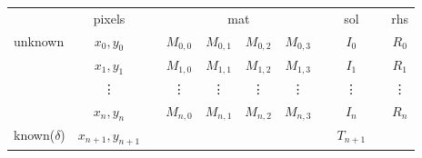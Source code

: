 \documentclass[hidelinks, english]{report}
\begin{document}
    \begin{table*}[t]
        \centering
        \begin{tabular}{lclcccccccc}
            & pixels & & \multicolumn{4}{c}{mat}                                                                                                           & \multicolumn{1}{l}{}  & sol & \multicolumn{1}{l}{}  & rhs                        \\ \cline{2-2} \cline{4-7} \cline{9-9} \cline{11-11}
            \multicolumn{1}{l|}{\multirow{4}{*}{unknown}}         & \multicolumn{1}{c|}{$x_0,y_0$}         & \multicolumn{1}{l|}{} & \multicolumn{1}{c|}{$M_{0,0}$} & \multicolumn{1}{c|}{$M_{0,1}$} & \multicolumn{1}{c|}{$M_{0,2}$} & \multicolumn{1}{c|}{$M_{0,3}$} & \multicolumn{1}{c|}{} & \multicolumn{1}{c|}{$I_0$}     & \multicolumn{1}{c|}{} & \multicolumn{1}{c|}{$R_0$} \\ \cline{2-2} \cline{4-7} \cline{9-9} \cline{11-11}
            \multicolumn{1}{l|}{}                                 & \multicolumn{1}{c|}{$x_1,y_1$}         & \multicolumn{1}{l|}{} & \multicolumn{1}{c|}{$M_{1,0}$} & \multicolumn{1}{c|}{$M_{1,1}$} & \multicolumn{1}{c|}{$M_{1,2}$} & \multicolumn{1}{c|}{$M_{1,3}$} & \multicolumn{1}{c|}{} & \multicolumn{1}{c|}{$I_1$}     & \multicolumn{1}{c|}{} & \multicolumn{1}{c|}{$R_1$} \\ \cline{2-2} \cline{4-7} \cline{9-9} \cline{11-11}
            \multicolumn{1}{l|}{}                                 & \multicolumn{1}{c|}{\vdots}            & \multicolumn{1}{l|}{} & \multicolumn{1}{c|}{\vdots}    & \multicolumn{1}{c|}{\vdots}     & \multicolumn{1}{c|}{\vdots}  & \multicolumn{1}{c|}{\vdots}    & \multicolumn{1}{c|}{} & \multicolumn{1}{c|}{\vdots}    & \multicolumn{1}{c|}{} & \multicolumn{1}{c|}{\vdots}\\ \cline{2-2} \cline{4-7} \cline{9-9} \cline{11-11}
            \multicolumn{1}{l|}{}                                 & \multicolumn{1}{c|}{$x_n,y_n$}         & \multicolumn{1}{l|}{} & \multicolumn{1}{c|}{$M_{n,0}$} & \multicolumn{1}{c|}{$M_{n,1}$} & \multicolumn{1}{c|}{$M_{n,2}$} & \multicolumn{1}{c|}{$M_{n,3}$} & \multicolumn{1}{c|}{} & \multicolumn{1}{c|}{$I_n$}     & \multicolumn{1}{c|}{} & \multicolumn{1}{c|}{$R_n$} \\ \cline{2-2} \cline{4-7} \cline{9-9} \cline{11-11}
            \multicolumn{1}{l|}{\multirow{3}{*}{known($\delta$)}} & \multicolumn{1}{c|}{$x_{n+1},y_{n+1}$} & & & & & & \multicolumn{1}{c|}{} & \multicolumn{1}{c|}{$T_{n+1}$} & &                            \\ \cline{2-2} \cline{9-9}

\end{tabular}
\end{table*}
\end{document}

